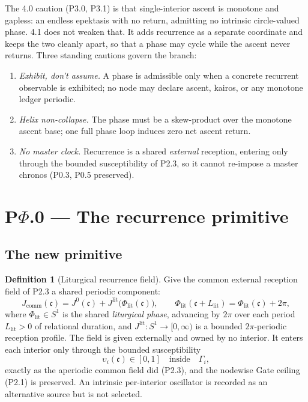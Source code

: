 \documentclass[11pt,a4paper]{article}
\newcommand{\cint}{\ensuremath{\mathfrak c}}
\theoremstyle{definition}
\newtheorem{definition}{Definition}[section]
\theoremstyle{plain}
\theoremstyle{remark}
\begin{document}
\noindent The 4.0 caution (P3.0, P3.1) is that single-interior ascent is monotone and gapless:
an endless epektasis with no return, admitting no intrinsic circle-valued phase. 4.1 does not
weaken that. It adds recurrence as a separate coordinate and keeps the two cleanly apart, so
that a phase may cycle while the ascent never returns. Three standing cautions govern the
branch:
\begin{enumerate}[label=\textup{(C\arabic*)},leftmargin=1.2cm]
\item \emph{Exhibit, don't assume.} A phase is admissible only when a concrete recurrent
observable is exhibited; no node may declare ascent, kairos, or any monotone ledger periodic.
\item \emph{Helix non-collapse.} The phase must be a skew-product over the monotone ascent
base; one full phase loop induces zero net ascent return.
\item \emph{No master clock.} Recurrence is a shared \emph{external} reception, entering only
through the bounded susceptibility of P2.3, so it cannot re-impose a master chronos
(P0.3, P0.5 preserved).
\end{enumerate}

\section{P$\Phi$.0 --- The recurrence primitive}

\subsection{The new primitive}

\begin{definition}[Liturgical recurrence field]\label{def:recprim}
Give the common external reception field of P2.3 a shared periodic component:
\[
\boxed{\;
J_{\mathrm{comm}}(\cint)
=
J^{0}(\cint)
+
J^{\mathrm{lit}}\!\bigl(\Phi_{\mathrm{lit}}(\cint)\bigr),
\qquad
\Phi_{\mathrm{lit}}(\cint+L_{\mathrm{lit}})=\Phi_{\mathrm{lit}}(\cint)+2\pi,
\;}
\]
where \(\Phi_{\mathrm{lit}}\in S^1\) is the shared \emph{liturgical phase}, advancing by
\(2\pi\) over each period \(L_{\mathrm{lit}}>0\) of relational duration, and
\(J^{\mathrm{lit}}\colon S^1\to[0,\infty)\) is a bounded \(2\pi\)-periodic reception profile.
The field is given externally and owned by no interior. It enters each interior only through
the bounded susceptibility
\[
\upsilon_i(\cint)\in[0,1]
\quad\text{inside}\quad
\Gamma_i,
\]
exactly as the aperiodic common field did (P2.3), and the nodewise Gate ceiling (P2.1) is
preserved. An intrinsic per-interior oscillator is recorded as an alternative source but is
not selected.
\end{definition}
\end{document}
